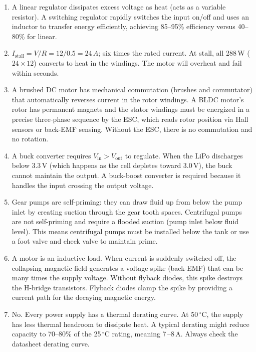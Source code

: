 \documentclass[11pt,letterpaper,twoside,openany]{book}
\begin{document}
\begin{enumerate}[leftmargin=1.5em]
  \item A linear regulator dissipates excess voltage as heat (acts as a variable resistor). A switching regulator rapidly switches the input on/off and uses an inductor to transfer energy efficiently, achieving 85--95\% efficiency versus 40--80\% for linear.

  \item $I_{\text{stall}} = V/R = 12/0.5 = 24\,A$; six times the rated current. At stall, all 288\,W ($24 \times 12$) converts to heat in the windings. The motor will overheat and fail within seconds.

  \item A brushed DC motor has mechanical commutation (brushes and commutator) that automatically reverses current in the rotor windings. A BLDC motor's rotor has permanent magnets and the stator windings must be energized in a precise three-phase sequence by the ESC, which reads rotor position via Hall sensors or back-EMF sensing. Without the ESC, there is no commutation and no rotation.

  \item A buck converter requires $V_{\text{in}} > V_{\text{out}}$ to regulate. When the LiPo discharges below 3.3\,V (which happens as the cell depletes toward 3.0\,V), the buck cannot maintain the output. A buck-boost converter is required because it handles the input crossing the output voltage.

  \item Gear pumps are self-priming: they can draw fluid up from below the pump inlet by creating suction through the gear tooth spaces. Centrifugal pumps are not self-priming and require a flooded suction (pump inlet below fluid level). This means centrifugal pumps must be installed below the tank or use a foot valve and check valve to maintain prime.

  \item A motor is an inductive load. When current is suddenly switched off, the collapsing magnetic field generates a voltage spike (back-EMF) that can be many times the supply voltage. Without flyback diodes, this spike destroys the H-bridge transistors. Flyback diodes clamp the spike by providing a current path for the decaying magnetic energy.

  \item No. Every power supply has a thermal derating curve. At 50\,$^{\circ}$C, the supply has less thermal headroom to dissipate heat. A typical derating might reduce capacity to 70--80\% of the 25\,$^{\circ}$C rating, meaning 7\,--8\,A. Always check the datasheet derating curve.


\end{enumerate}
\end{document}
